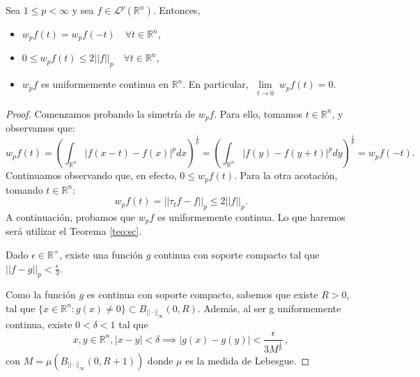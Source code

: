 \begin{proposicion}\label{mod_cont}
Sea $1\leq p < \infty$ y sea $f \in \mathscr{L}^p(\mathbb{R}^n)$. Entonces, 
\begin{itemize}
    \item $w_pf(t)=w_pf(-t) \quad \forall t \in \mathbb{R}^n$,
    \item $0 \leq w_pf(t)  \leq 2||f||_p \quad \forall t \in \mathbb{R}^n$,
    \item $w_pf$ es uniformemente continua en $\mathbb{R}^n$. En particular, $\underset{\substack{t \rightarrow 0}}{\lim}w_pf(t)=0.$
\end{itemize}
\end{proposicion}
\begin{proof}
Comenzamos probando la simetría de $w_pf$. Para ello, tomamos $t \in \mathbb{R}^n$, y observamos que:
\begin{equation}
    w_pf(t) = \left(\int_{\mathbb{R}^n} |f(x-t)-f(x)|^p dx\right)^{\frac{1}{p}} = \left(\int_{\mathbb{R}^n} |f(y)-f(y+t)|^p dy\right)^{\frac{1}{p}}=w_pf(-t).
\end{equation}
Continuamos observando que, en efecto, $0 \leq w_pf(t)$. Para la otra acotación, tomando $t \in \mathbb{R}^n$:
\begin{equation}
     w_pf(t) =||\tau_tf-f||_p \leq 2 ||f||_p.
\end{equation}
A continuación, probamos que $w_pf$ es uniformemente continua. 
Lo que haremos será utilizar el Teorema \ref{teo:sc}.

\noindent Dado $\epsilon \in \mathbb{R}^+$, existe una función $g$ continua con soporte compacto tal que $||f-g||_p < \frac{\epsilon}{3}$.

\noindent Como la función $g$ es continua con soporte compacto, sabemos que existe $R>0$, tal que $\{x \in \mathbb{R}^n : g(x) \neq 0\} \subset B_{||\cdot||_\infty}(0,R)$. Además, al ser g uniformemente continua, existe $0 < \delta <1$ tal que
\begin{equation}\label{eq:acot}
    x,y \in \mathbb{R}^n, |x-y| < \delta \implies |g(x)-g(y)| < \frac{\epsilon}{3M^{\frac{1}{p}}}\,,
\end{equation}
con $M = \mu({B_{||\cdot||_\infty}(0,R+1)})$ donde $\mu$ es la medida de Lebesgue.


\end{proof}
